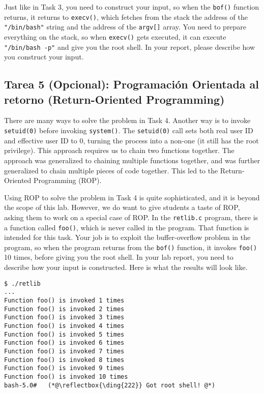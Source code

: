Just like in Task 3, you need to construct your input, so when the \texttt{bof()}
function returns, it returns to \texttt{execv()}, which fetches from the stack
the address of the \texttt{"/bin/bash"} string and the address of the \texttt{argv[]} 
array. You need to prepare everything on the stack, so when \texttt{execv()}
gets executed, it can execute \texttt{"/bin/bash -p"} and give you the root shell. 
In your report, please describe how you construct your input. 



\subsection{Tarea 5 (Opcional): Programación Orientada al retorno (Return-Oriented Programming)}

There are many ways to solve the problem in Task 4. 
Another way is to invoke \texttt{setuid(0)} before 
invoking \texttt{system()}. The \texttt{setuid(0)} call sets both real user ID and  
effective user ID to 0, turning the process into a non-\setuid one (it still has 
the root privilege). This approach requires us to chain two functions
together. The approach was generalized to chaining multiple functions together, and 
was further generalized to chain multiple pieces of code together. 
This led to the Return-Oriented Programming (ROP). 

Using ROP to solve the problem in Task 4 is quite sophisticated, 
and it is beyond the scope of this lab. However, we do want to
give students a taste of ROP, asking them 
to work on a special case of ROP.
In the \texttt{retlib.c} program, there is a function called \texttt{foo()}, which 
is never called in the program. That function is intended for this task. Your job is 
to exploit the buffer-overflow problem in the program, so when the program
returns from the \texttt{bof()} function, it invokes \texttt{foo()} 10 times, before
giving you the root shell. In your lab report, you need to describe how your 
input is constructed.  Here is what the results will look like. 

\begin{lstlisting}
$ ./retlib
...
Function foo() is invoked 1 times
Function foo() is invoked 2 times
Function foo() is invoked 3 times
Function foo() is invoked 4 times
Function foo() is invoked 5 times
Function foo() is invoked 6 times
Function foo() is invoked 7 times
Function foo() is invoked 8 times
Function foo() is invoked 9 times
Function foo() is invoked 10 times
bash-5.0#   (*@\reflectbox{\ding{222}} Got root shell! @*)
\end{lstlisting}
 
